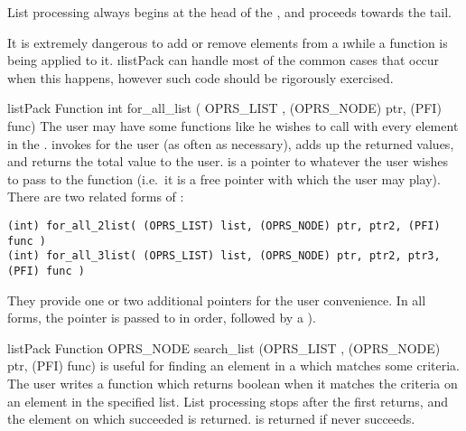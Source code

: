 List processing always begins at the head of the , and proceeds
towards the tail.

 It is extremely dangerous to add or remove elements from
a  \i{while a function is being applied to it}. \i{listPack} can
handle most of the common cases that occur when this happens, however such code
should be rigorously exercised.

\begin{typefn}{listPack Function} {int} {for\_all\_list} {( OPRS\_LIST ,
(OPRS\_NODE) ptr, (PFI) func)}
The user may have some functions like  he wishes to call with every element in the .  invokes  for the user (as
often as necessary), adds up the returned values, and returns the total value
to the user.  is a pointer to whatever the user wishes
to pass to the function (i.e.\ it is a free pointer with which the user may
play). There are two related forms of :

\begin{verbatim}
(int) for_all_2list( (OPRS_LIST) list, (OPRS_NODE) ptr, ptr2, (PFI) func )
(int) for_all_3list( (OPRS_LIST) list, (OPRS_NODE) ptr, ptr2, ptr3, (PFI) func )
\end{verbatim}

They provide one or two additional pointers for the user convenience.
In all forms, the pointer is passed to  in order, followed
by a  ).
\end{typefn}

\begin{typefn}{listPack Function} {OPRS\_NODE} {search\_list} {(OPRS\_LIST ,
(OPRS\_NODE) ptr, (PFI) func)}
 is useful for finding an element in a 
which matches some criteria. The user writes a function  which returns boolean  when it
matches the criteria on an element in the specified list. List processing
stops after the first
 returns, and the element on which  succeeded is
returned.  is returned if  never succeeds.
\end{typefn}

